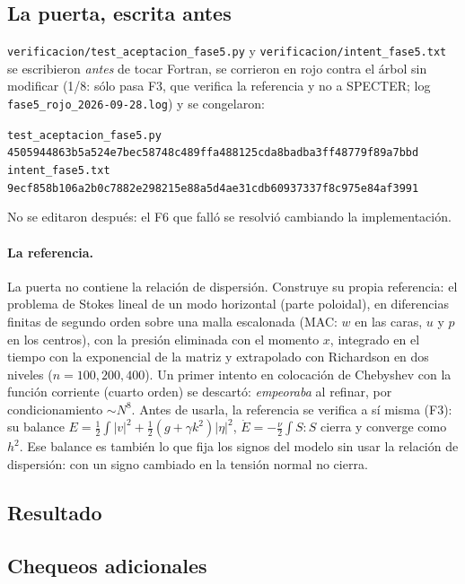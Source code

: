 \documentclass[11pt,a4paper]{article}
\newcommand{\archivo}[1]{\nolinkurl{#1}}
\begin{document}
\subsection{La puerta, escrita antes}

\archivo{verificacion/test_aceptacion_fase5.py} y
\archivo{verificacion/intent_fase5.txt} se escribieron \emph{antes} de tocar Fortran, se
corrieron en rojo contra el árbol sin modificar (1/8: sólo pasa F3, que verifica la
referencia y no a SPECTER; log \archivo{fase5_rojo_2026-09-28.log}) y se congelaron:
\begin{center}\small
\texttt{test\_aceptacion\_fase5.py}\quad
\texttt{4505944863b5a524e7bec58748c489ffa488125cda8badba3ff48779f89a7bbd}\\
\texttt{intent\_fase5.txt}\quad
\texttt{9ecf858b106a2b0c7882e298215e88a5d4ae31cdb60937337f8c975e84af3991}
\end{center}
No se editaron después: el F6 que falló se resolvió cambiando la implementación.

\paragraph{La referencia.} La puerta no contiene la relación de dispersión. Construye su
propia referencia: el problema de Stokes lineal de un modo horizontal (parte poloidal),
en diferencias finitas de segundo orden sobre una malla escalonada (MAC: $w$ en las caras,
$u$ y $p$ en los centros), con la presión eliminada con el momento $x$, integrado en el
tiempo con la exponencial de la matriz y extrapolado con Richardson en dos niveles
($n=100,200,400$). Un primer intento en colocación de Chebyshev con la función corriente
(cuarto orden) se descartó: \emph{empeoraba} al refinar, por condicionamiento $\sim N^8$.
Antes de usarla, la referencia se verifica a sí misma (F3): su balance
$E=\tfrac12\!\int|v|^2+\tfrac12(g+\gamma k^2)|\eta|^2$, $\dot E=-\tfrac\nu2\!\int S\!:\!S$
cierra y converge como $h^2$. Ese balance es también lo que fija los signos del modelo sin
usar la relación de dispersión: con un signo cambiado en la tensión normal no cierra.

\subsection{Resultado}



\subsection{Chequeos adicionales}
\label{sec:extras}
\end{document}
